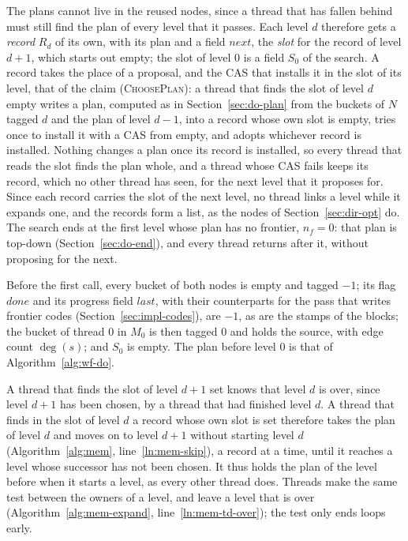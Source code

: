 The plans cannot live in the reused nodes, since a thread that has fallen behind must still find the plan of every level that it passes. Each level $d$ therefore gets a \emph{record} $R_d$ of its own, with its plan and a field $\mathit{next}$, the \emph{slot} for the record of level $d+1$, which starts out empty; the slot of level $0$ is a field $S_0$ of the search. A record takes the place of a proposal, and the CAS that installs it in the slot of its level, that of the claim (\textsc{ChoosePlan}): a thread that finds the slot of level $d$ empty writes a plan, computed as in Section~\ref{sec:do-plan} from the buckets of $N$ tagged $d$ and the plan of level $d-1$, into a record whose own slot is empty, tries once to install it with a CAS from empty, and adopts whichever record is installed. Nothing changes a plan once its record is installed, so every thread that reads the slot finds the plan whole, and a thread whose CAS fails keeps its record, which no other thread has seen, for the next level that it proposes for. Since each record carries the slot of the next level, no thread links a level while it expands one, and the records form a list, as the nodes of Section~\ref{sec:dir-opt} do. The search ends at the first level whose plan has no frontier, $n_f = 0$: that plan is top-down (Section~\ref{sec:do-end}), and every thread returns after it, without proposing for the next.

Before the first call, every bucket of both nodes is empty and tagged $-1$; its flag $\mathit{done}$ and its progress field $\mathit{last}$, with their counterparts for the pass that writes frontier codes (Section~\ref{sec:impl-codes}), are $-1$, as are the stamps of the blocks; the bucket of thread 0 in $M_0$ is then tagged 0 and holds the source, with edge count $\deg(s)$; and $S_0$ is empty. The plan before level 0 is that of Algorithm~\ref{alg:wf-do}.

A thread that finds the slot of level $d+1$ set knows that level $d$ is over, since level $d+1$ has been chosen, by a thread that had finished level $d$. A thread that finds in the slot of level $d$ a record whose own slot is set therefore takes the plan of level $d$ and moves on to level $d+1$ without starting level $d$ (Algorithm~\ref{alg:mem}, line~\ref{ln:mem-skip}), a record at a time, until it reaches a level whose successor has not been chosen. It thus holds the plan of the level before when it starts a level, as every other thread does. Threads make the same test between the owners of a level, and leave a level that is over (Algorithm~\ref{alg:mem-expand}, line~\ref{ln:mem-td-over}); the test only ends loops early.

